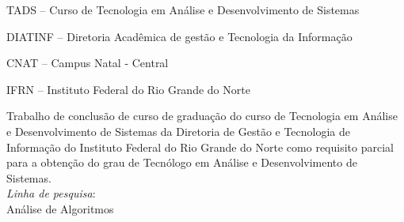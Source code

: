 
\instituicao
{
   TADS -- Curso de Tecnologia em Análise e Desenvolvimento de
   Sistemas\par 
   DIATINF -- Diretoria Acadêmica de gestão e Tecnologia da Informação\par 
   CNAT -- Campus Natal - Central\par 
   IFRN -- Instituto Federal do Rio Grande do Norte }
	
\comentario
{
	Trabalho de conclusão de curso de graduação do curso de Tecnologia em Análise e
	Desenvolvimento de Sistemas da Diretoria de Gestão e Tecnologia de Informação
	do Instituto Federal do Rio Grande do Norte como requisito parcial para a
	obtenção do grau de Tecnólogo em Análise e Desenvolvimento de
	Sistemas.\bigskip\\
   \textit{Linha de pesquisa}:\\Análise de Algoritmos
}
		
	
\folhaderosto